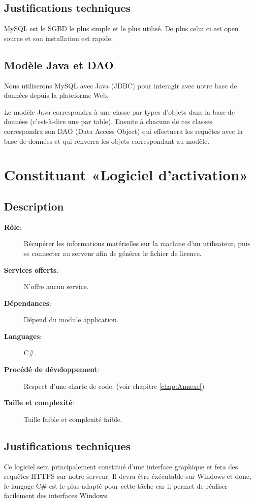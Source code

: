 \subsection*{Justifications techniques}
MySQL est le SGBD le plus simple et le plus utilisé. De plus celui ci est open source et son
installation est rapide.

\subsection*{Modèle Java et DAO}
Nous utiliserons MySQL avec Java (JDBC) pour interagir avec notre base de données
depuis la plateforme Web.

Le modèle Java correspondra à une classe par types d'objets dans la base de données (c'est-à-dire
une par table). Ensuite à chacune de ces classes correspondra son DAO (Data Access Object) qui
effectuera les requêtes avec la base de données et qui renverra les objets correspondant au modèle.

\section{Constituant «Logiciel d'activation»}

\subsection*{Description}
\begin{description}
	\item[\textbf{Rôle}:]
		Récupérer les informations matérielles sur la machine d'un utilisateur, puis 
		se connecter au serveur afin de générer le fichier de licence.
	\item[\textbf{Services offerts}:] 
		N'offre aucun service.
	\item[\textbf{Dépendances}:]
		Dépend du module application.
	\item[\textbf{Languages}:]
		C\#.
	\item[\textbf{Procédé de développement}:]
		Respect d'une charte de code. (voir chapitre \ref{chap:Annexe})
	\item[\textbf{Taille et complexité}:]
		Taille faible et complexité faible. 
\end{description}

\subsection*{Justifications techniques}
Ce logiciel sera principalement constitué d'une interface graphique et fera des requêtes HTTPS sur
notre serveur. Il devra être éxécutable sur Windows et donc, le langage C\# est le plus adapté pour
cette tâche car il permet de réaliser facilement des interfaces Windows.
\newpage

